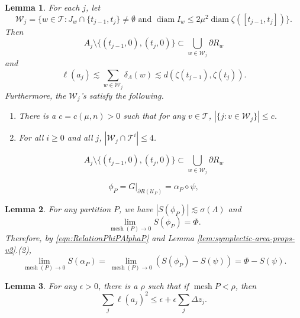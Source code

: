 \documentclass[10pt,a4paper]{amsart}
\newtheorem{lemma}{Lemma}
\newcommand{\cT}{\mathcal{T}}
\newcommand{\cU}{\mathcal{U}}
\newcommand{\cW}{\mathcal{W}}
\DeclareMathOperator{\diam}{diam}
\DeclareMathOperator{\mesh}{mesh}
\begin{document}
\begin{lemma}\label{lem:arch-lengths}
  For each $j$, let
  \begin{equation}\label{eq:def-cwj}
    \cW_j = \{w\in \cT : J_w\cap \{t_{j-1},t_j\} \ne \emptyset \text{ and } \diam I_w \le 2 \mu^2 \diam \zeta([t_{j-1},t_j])\}.
  \end{equation}
  Then 
  \begin{equation}\label{eq:boundary-graph}
    A_j\setminus \{(t_{j-1},0), (t_{j},0)\} \subset \bigcup_{w\in \cW_j} \partial R_w
  \end{equation}
  and 
  \begin{equation}\label{eq:alpha-length}
    \ell(a_j) \lesssim \sum_{w\in \cW_j} \delta_\Lambda(w) \lesssim  d(\zeta(t_{j-1}),\zeta(t_j)).
  \end{equation}
  Furthermore, the $\cW_j$'s satisfy the following.
  \begin{enumerate}
  \item\label{it:W-multiplicity}
    There is a $c = c(\mu,n) >0$ such that for any $v\in \cT$, $|\{j : v\in \cW_j\}|\le c$.
  \item\label{it:arch-count}
    For all $i\ge 0$ and all $j$, $|\cW_j \cap \cT^i| \le 4$.
  \end{enumerate}
\end{lemma}

  \begin{equation}
    A_j\setminus \{(t_{j-1},0), (t_{j},0)\} \subset \bigcup_{w\in \cW_j} \partial R_w
  \end{equation}

\begin{equation}\label{eqn:RelationPhiPAlphaP}
\phi_P = G|_{\partial R(\cU_P)} = \alpha_P \diamond \psi,
\end{equation}

\begin{lemma}\label{lem:lim-dyadic}
  For any partition $P$, we have $|S(\phi_P)| \lesssim \sigma(\Lambda)$ and
  \begin{equation}\label{eq:lim-dyadic}
    \lim_{\mesh(P)\to 0} S(\phi_P) = \Phi.
  \end{equation}
  Therefore, by \eqref{eqn:RelationPhiPAlphaP} and Lemma \ref{lem:symplectic-area-props-v2}.(2),
  $$\lim_{\mesh(P)\to 0} S(\alpha_P) = \lim_{\mesh(P)\to 0} (S(\phi_P) - S(\psi)) = \Phi - S(\psi).$$
\end{lemma}

\begin{lemma}\label{lem:arch-area}
  For any $\epsilon>0$, there is a $\rho$ such that if $\mesh P<\rho$, then
  \begin{equation}\label{eq:arch-area}
    \sum_j \ell(a_j)^2 \le \epsilon + \epsilon \sum_j \Delta z_j.
  \end{equation}
\end{lemma}
\end{document}
